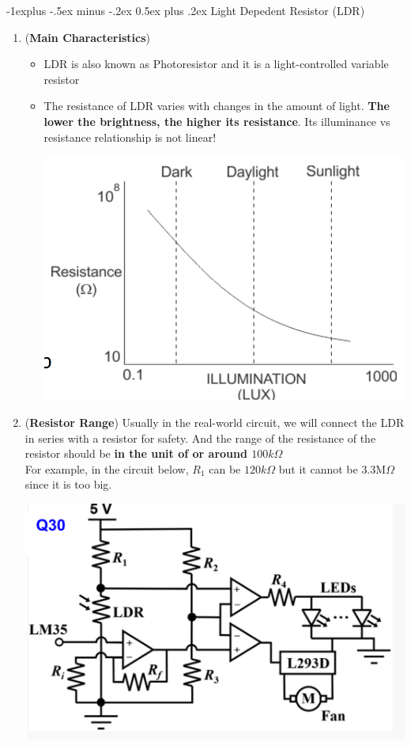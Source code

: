 \documentclass[10pt, landscape]{article}
\makeatletter
\renewcommand{\subsection}{\@startsection{subsection}{2}{0mm}%
                                {-1explus -.5ex minus -.2ex}%
                                {0.5ex plus .2ex}%
                                {\normalfont\normalsize\bfseries}}
\makeatother
\begin{document}
\begin{multicols}{4}
\subsection{Light Depedent Resistor (LDR)}
\begin{enumerate}
    \item (\textbf{Main Characteristics})
    \begin{itemize}
        \item LDR is also known as Photoresistor and it is a light-controlled variable resistor
        \item The resistance of LDR varies with changes in the amount of light. \textbf{The lower the brightness, the higher its resistance}. Its illuminance vs resistance relationship is not linear! \\
        \centerline{\includegraphics[width=0.7\linewidth]{images/ldr-illuminance-resistance.png}}
    \end{itemize}
    \item (\textbf{Resistor Range}) Usually in the real-world circuit, we will connect the LDR in series with a resistor for safety. And the range of the resistance of the resistor should be \textbf{in the unit of or around $100k\Omega$} \\
    For example, in the circuit below, $R_1$ can be $120k\Omega$ but it cannot be $3.3\text{M}\Omega$ since it is too big. \\
    \centerline{\includegraphics[width=0.8\linewidth]{images/ldr-resistor-range.png}}
\end{enumerate}
\end{multicols}
\end{document}
